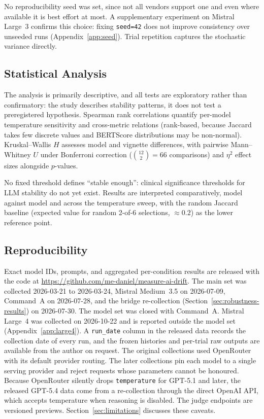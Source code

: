 No reproducibility seed was set, since not all vendors support one and even where available it is best effort at most. A supplementary experiment on Mistral Large~3 confirms this choice: fixing \texttt{seed=42} does not improve consistency over unseeded runs (Appendix~\ref{app:seed}). Trial repetition captures the stochastic variance directly.

\subsection{Statistical Analysis}
\label{sec:stats}

The analysis is primarily descriptive, and all tests are exploratory rather than confirmatory: the study describes stability patterns, it does not test a preregistered hypothesis. Spearman rank correlations quantify per-model temperature sensitivity and cross-metric relations (rank-based, because Jaccard takes few discrete values and BERTScore distributions may be non-normal). Kruskal--Wallis $H$ assesses model and vignette differences, with pairwise Mann--Whitney $U$ under Bonferroni correction ($\binom{12}{2}=66$ comparisons) and $\eta^2$ effect sizes alongside $p$-values.

No fixed threshold defines ``stable enough'': clinical significance thresholds for LLM stability do not yet exist. Results are interpreted comparatively, model against model and across the temperature sweep, with the random Jaccard baseline (expected value for random 2-of-6 selections, $\approx 0.2$) as the lower reference point.

\subsection{Reproducibility}

Exact model IDs, prompts, and aggregated per-condition results are released with the code at \url{https://github.com/me-daniel/measure-ai-drift}. The main set was collected 2026-03-21 to 2026-03-24, Mistral Medium~3.5 on 2026-07-09, Command~A on 2026-07-28, and the bridge re-collection (Section~\ref{sec:robustness-results}) on 2026-07-30. The model set was closed with Command~A. Mistral Large~4 was collected on 2026-10-22 and is reported outside the model set (Appendix~\ref{app:large4}). A \texttt{run\_date} column in the released data records the collection date of every run, and the frozen histories and per-trial raw outputs are available from the author on request. The original collections used OpenRouter with its default provider routing. The later collections pin each model to a single serving provider and reject requests whose parameters cannot be honoured. Because OpenRouter silently drops \texttt{temperature} for GPT-5.1 and later, the released GPT-5.4 data come from a re-collection through the direct OpenAI API, which accepts temperature when reasoning is disabled. The judge endpoints are versioned previews. Section~\ref{sec:limitations} discusses these caveats.
